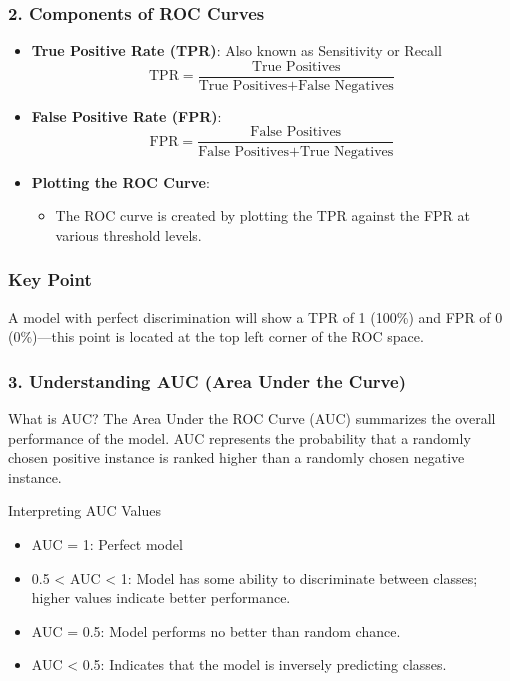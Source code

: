 \documentclass[aspectratio=169]{beamer}
\begin{document}
\begin{frame}[fragile]
    \frametitle{2. Components of ROC Curves}
    \begin{itemize}
        \item \textbf{True Positive Rate (TPR)}: Also known as Sensitivity or Recall
        \begin{equation}
            \text{TPR} = \frac{\text{True Positives}}{\text{True Positives} + \text{False Negatives}}
        \end{equation}
        
        \item \textbf{False Positive Rate (FPR)}:
        \begin{equation}
            \text{FPR} = \frac{\text{False Positives}}{\text{False Positives} + \text{True Negatives}}
        \end{equation}
        
        \item \textbf{Plotting the ROC Curve}:
        \begin{itemize}
            \item The ROC curve is created by plotting the TPR against the FPR at various threshold levels.
        \end{itemize}
    \end{itemize}
\end{frame}

\begin{frame}[fragile]
    \frametitle{Key Point}
    A model with perfect discrimination will show a TPR of 1 (100\%) and FPR of 0 (0\%)—this point is located at the top left corner of the ROC space.
\end{frame}

\begin{frame}[fragile]
    \frametitle{3. Understanding AUC (Area Under the Curve)}
    \begin{block}{What is AUC?}
        The Area Under the ROC Curve (AUC) summarizes the overall performance of the model. AUC represents the probability that a randomly chosen positive instance is ranked higher than a randomly chosen negative instance.
    \end{block}
    
    \begin{block}{Interpreting AUC Values}
        \begin{itemize}
            \item AUC = 1: Perfect model
            \item 0.5 < AUC < 1: Model has some ability to discriminate between classes; higher values indicate better performance.
            \item AUC = 0.5: Model performs no better than random chance.
            \item AUC < 0.5: Indicates that the model is inversely predicting classes.
        \end{itemize}
    \end{block}
\end{frame}
\end{document}
